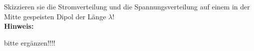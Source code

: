 \begin{question}[section=11,name={Strom und Spannungsverteilung 3},difficulty=,quantity=1,type=thr,tags={20130314}]
	Skizzieren sie die Stromverteilung und die Spannungsverteilung auf einem in der Mitte gespeisten Dipol der Länge $\lambda$! 
	\\ \textbf{Hinweis:}\\
	
\end{question}
\begin{solution}
	bitte ergänzen!!!!
\end{solution}